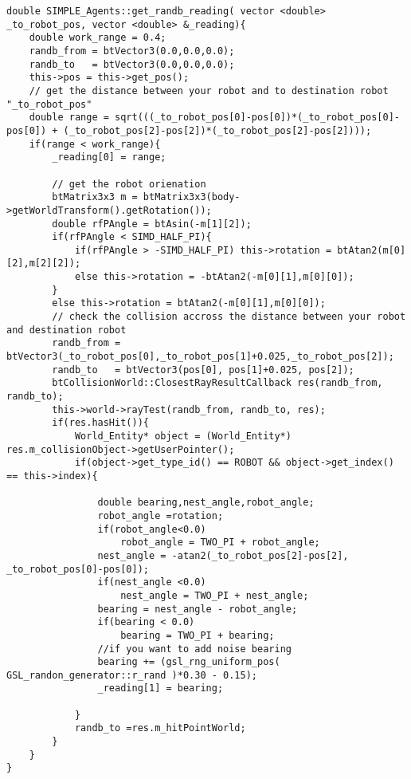 \begin{lstlisting}[caption = {Code of the Range and Bearing function}]
double SIMPLE_Agents::get_randb_reading( vector <double> _to_robot_pos, vector <double> &_reading){
    double work_range = 0.4;
    randb_from = btVector3(0.0,0.0,0.0);
    randb_to   = btVector3(0.0,0.0,0.0);
    this->pos = this->get_pos();
    // get the distance between your robot and to destination robot "_to_robot_pos"
    double range = sqrt(((_to_robot_pos[0]-pos[0])*(_to_robot_pos[0]-pos[0]) + (_to_robot_pos[2]-pos[2])*(_to_robot_pos[2]-pos[2])));
    if(range < work_range){
        _reading[0] = range;

        // get the robot orienation
        btMatrix3x3 m = btMatrix3x3(body->getWorldTransform().getRotation());
        double rfPAngle = btAsin(-m[1][2]);
        if(rfPAngle < SIMD_HALF_PI){
            if(rfPAngle > -SIMD_HALF_PI) this->rotation = btAtan2(m[0][2],m[2][2]);
            else this->rotation = -btAtan2(-m[0][1],m[0][0]);
        }
        else this->rotation = btAtan2(-m[0][1],m[0][0]);
        // check the collision accross the distance between your robot and destination robot
        randb_from = btVector3(_to_robot_pos[0],_to_robot_pos[1]+0.025,_to_robot_pos[2]);
        randb_to   = btVector3(pos[0], pos[1]+0.025, pos[2]);
        btCollisionWorld::ClosestRayResultCallback res(randb_from, randb_to);
        this->world->rayTest(randb_from, randb_to, res);
        if(res.hasHit()){
            World_Entity* object = (World_Entity*) res.m_collisionObject->getUserPointer();
            if(object->get_type_id() == ROBOT && object->get_index() == this->index){

                double bearing,nest_angle,robot_angle;
                robot_angle =rotation;
                if(robot_angle<0.0)
                    robot_angle = TWO_PI + robot_angle;
                nest_angle = -atan2(_to_robot_pos[2]-pos[2], _to_robot_pos[0]-pos[0]);
                if(nest_angle <0.0)
                    nest_angle = TWO_PI + nest_angle;
                bearing = nest_angle - robot_angle;
                if(bearing < 0.0)
                    bearing = TWO_PI + bearing;
                //if you want to add noise bearing
                bearing += (gsl_rng_uniform_pos( GSL_randon_generator::r_rand )*0.30 - 0.15);
                _reading[1] = bearing;

            }
            randb_to =res.m_hitPointWorld;
        }
    }
}
\end{lstlisting}
